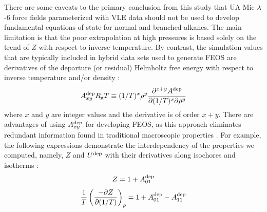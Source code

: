 \documentclass[preprint,letterpaper,floatfix,citeautoscript,aip,jcp]{revtex4-1}
\begin{document}
There are some caveats to the primary conclusion from this study that UA Mie $\lambda$-6 force fields parameterized with VLE data should not be used to develop fundamental equations of state for normal and branched alkanes. The main limitation is that the poor extrapolation at high pressures is based solely on the trend of $Z$ with respect to inverse temperature. 
By contrast, the simulation values that are typically included in hybrid data sets used to generate FEOS are derivatives of the departure (or residual) Helmholtz free energy with respect to inverse temperature and/or density \cite{Thol2016_siloxane_first,Thol2016_siloxane,Thol2017,Rutkai2013,Thol2015}:
\begin{equation} \label{Residual Derivatives}
A_{xy}^{\rm dep} R_{\rm g}T \equiv (1/T)^x\rho^y \frac{\partial^{x+y}A^{\rm dep}}{\partial(1/T)^x \partial \rho^y}
\end{equation}
where $x$ and $y$ are integer values and the derivative is of order $x + y$. There are advantages of using $A_{xy}^{\rm dep}$ for developing FEOS, as this approach eliminates redundant information found in traditional macroscopic properties \cite{Thol2016_LJ,Rutkai2017,Lustig2015,Rutkai2013,Rutkai2015}. For example, the following expressions demonstrate the interdependency of the properties we computed, namely, $Z$ and $U^{\rm dep}$ with their derivatives along isochores and isotherms \cite{Rutkai2015}:
\begin{equation} \label{eq:Z}
Z = 1 + A_{01}^{\rm dep}
\end{equation}
\begin{equation} \label{eq:Z_IC}
\frac{1}{T} \left(\frac{-\partial Z}{\partial(1/T)}\right)_\rho = 1 + A_{01}^{\rm dep} - A_{11}^{\rm dep}
\end{equation}
\end{document}
